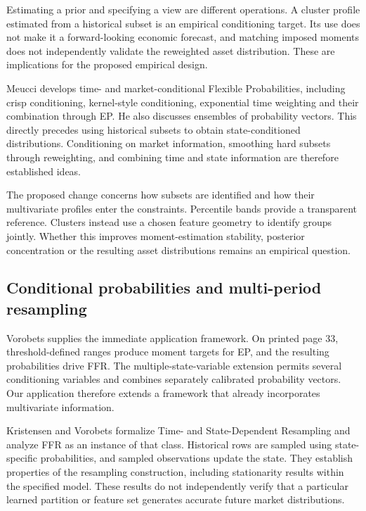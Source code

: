 \documentclass[11pt,a4paper]{article}
\begin{document}
Estimating a prior and specifying a view are different operations. A cluster profile estimated from a historical subset is an empirical conditioning target. Its use does not make it a forward-looking economic forecast, and matching imposed moments does not independently validate the reweighted asset distribution. These are implications for the proposed empirical design.

Meucci \cite{meucci2013} develops time- and market-conditional Flexible Probabilities, including crisp conditioning, kernel-style conditioning, exponential time weighting and their combination through EP. He also discusses ensembles of probability vectors. This directly precedes using historical subsets to obtain state-conditioned distributions. Conditioning on market information, smoothing hard subsets through reweighting, and combining time and state information are therefore established ideas.

The proposed change concerns how subsets are identified and how their multivariate profiles enter the constraints. Percentile bands provide a transparent reference. Clusters instead use a chosen feature geometry to identify groups jointly. Whether this improves moment-estimation stability, posterior concentration or the resulting asset distributions remains an empirical question.

\subsection{Conditional probabilities and multi-period resampling}

Vorobets \cite{vorobets2025} supplies the immediate application framework. On printed page 33, threshold-defined ranges produce moment targets for EP, and the resulting probabilities drive FFR. The multiple-state-variable extension permits several conditioning variables and combines separately calibrated probability vectors. Our application therefore extends a framework that already incorporates multivariate information.

Kristensen and Vorobets \cite{kristensenvorobets2025} formalize Time- and State-Dependent Resampling and analyze FFR as an instance of that class. Historical rows are sampled using state-specific probabilities, and sampled observations update the state. They establish properties of the resampling construction, including stationarity results within the specified model. These results do not independently verify that a particular learned partition or feature set generates accurate future market distributions.
\end{document}
